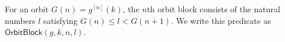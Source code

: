 \begin{definition}
For an orbit $G(n)=g^{[n]}(k)$, the $n$th orbit block consists of the
natural numbers $l$ satisfying
$G(n)\leq l<G(n+1)$.  We write this predicate as
$\mathsf{OrbitBlock}(g,k,n,l)$.
\end{definition}
